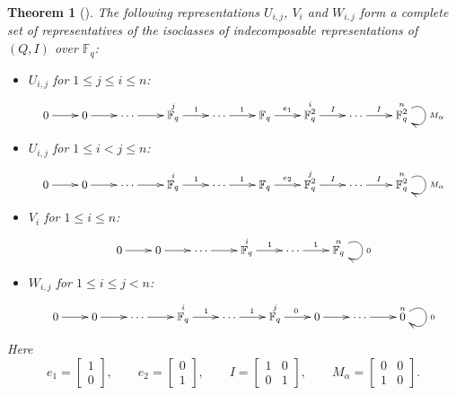 \documentclass[12pt]{amsart}
\newtheorem{theorem}{Theorem}[section]
\theoremstyle{remark}
\theoremstyle{definition}
\numberwithin{equation}{section}
\begin{document}
\begin{theorem}[{\cite[Theorem 2.8]{CY24}}]\label{thm:indec-classification-gentle-one-cycle}
The following representations $U_{i,j}$, $V_i$ and $W_{i,j}$ form a complete set
of representatives of the isoclasses of indecomposable  representations of $(Q,I)$ over $\mathbb{F}_q$:

\begin{itemize}

\item $U_{i,j}$ for $1\le j\le i\le n$:
\[
{\small
\xymatrix@C=2.2em{
0 \ar[r] &
0 \ar[r] &
\cdots \ar[r] &
\overset{j}{\mathbb{F}_q} \ar[r]^{1} &
\cdots \ar[r]^{1} &
{\mathbb{F}_q} \ar[r]^{e_1} &
\overset{i}{\mathbb{F}_q^2} \ar[r]^{I} &
\cdots \ar[r]^{I} &
\overset{n}{\mathbb{F}_q^2} \ar@(ur,dr)^{M_\alpha}
}
}
\]

\item $U_{i,j}$ for $1\le i<j\le n$:
\[
{\small
\xymatrix@C=2.2em{
0 \ar[r] &
0 \ar[r] &
\cdots \ar[r] &
\overset{i}{\mathbb{F}_q} \ar[r]^{1} &
\cdots \ar[r]^{1} &
{\mathbb{F}_q} \ar[r]^{e_2} &
\overset{j}{\mathbb{F}_q^2} \ar[r]^{I} &
\cdots \ar[r]^{I} &
\overset{n}{\mathbb{F}_q^2} \ar@(ur,dr)^{M_\alpha}
}
}
\]

\item $V_i$ for $1\le i\le n$:
\[
{\small
\xymatrix@C=2.2em{
0 \ar[r] &
0 \ar[r] &
\cdots \ar[r] &
\overset{i}{\mathbb{F}_q} \ar[r]^{1} &
\cdots \ar[r]^{1} &
\overset{n}{\mathbb{F}_q} \ar@(ur,dr)^{0}
}
}
\]

\item $W_{i,j}$ for $1\le i\le j<n$:
\[
{\small
\xymatrix@C=2.2em{
0 \ar[r] &
0 \ar[r] &
\cdots \ar[r] &
\overset{i}{\mathbb{F}_q} \ar[r]^{1} &
\cdots \ar[r]^{1} &
\overset{j}{\mathbb{F}_q} \ar[r]^{0} &
0 \ar[r] &
\cdots \ar[r] &
\overset{n}{0} \ar@(ur,dr)^{0}
}
}
\]

\end{itemize}

Here
\[
e_1=
\begin{bmatrix}
1\\
0
\end{bmatrix},
\qquad
e_2=
\begin{bmatrix}
0\\
1
\end{bmatrix},
\qquad
I=
\begin{bmatrix}
1&0\\
0&1
\end{bmatrix},
\qquad
M_\alpha=
\begin{bmatrix}
0&0\\
1&0
\end{bmatrix}.
\]
\end{theorem}
\end{document}
